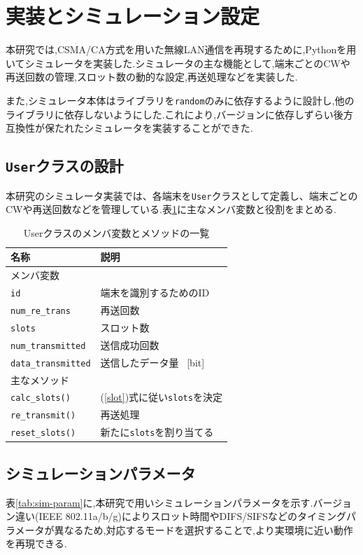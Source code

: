 \documentclass[a4paper, 10pt]{ltjsarticle}
\begin{document}
\section{実装とシミュレーション設定}

本研究では,CSMA/CA方式を用いた無線LAN通信を再現するために,Pythonを用いてシミュレータを実装した.シミュレータの主な機能として,端末ごとのCWや再送回数の管理,スロット数の動的な設定,再送処理などを実装した.

また,シミュレータ本体はライブラリを\texttt{random}のみに依存するように設計し,他のライブラリに依存しないようにした.これにより,バージョンに依存しずらい後方互換性が保たれたシミュレータを実装することができた.


\subsection{\texttt{User}クラスの設計}
本研究のシミュレータ実装では、各端末を\texttt{User}クラスとして定義し、端末ごとのCWや再送回数などを管理している.表\ref{tab:user-class}に主なメンバ変数と役割をまとめる.

\begin{table}[H]
  \centering
  \caption{Userクラスのメンバ変数とメソッドの一覧}
  \label{tab:user-class}
  \begin{tabularx}{\columnwidth}{lX}
    \hline
    名称 & 説明 \\
    \hline
    \multicolumn{2}{l}{メンバ変数} \\
    \hline
    \texttt{id} & 端末を識別するためのID\\
    \texttt{num\_re\_trans} & 再送回数\\
    \texttt{slots} & スロット数\\
    \texttt{num\_transmitted} & 送信成功回数\\
    \texttt{data\_transmitted} & 送信したデータ量 \, [bit]\\
    \hline
    \multicolumn{2}{l}{主なメソッド} \\
    \hline
    \texttt{calc\_slots()} &(\ref{slot})式に従い\texttt{slots}を決定\\
    \texttt{re\_transmit()} & 再送処理\\
    \texttt{reset\_slots()} & 新たに\texttt{slots}を割り当てる\\
    \hline
  \end{tabularx}
\end{table}

\subsection{シミュレーションパラメータ}
表\ref{tab:sim-param}に,本研究で用いシミュレーションパラメータを示す.バージョン違い(IEEE 802.11a/b/g)によりスロット時間やDIFS/SIFSなどのタイミングパラメータが異なるため,対応するモードを選択することで,より実環境に近い動作を再現できる.
\end{document}
